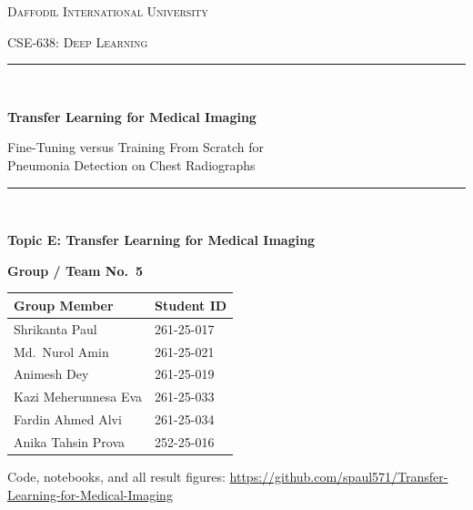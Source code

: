\documentclass[11pt,a4paper]{article}
\numberwithin{figure}{section}
\numberwithin{table}{section}
\begin{document}
\begin{titlepage}
\centering
\vspace*{1.5cm}

{\scshape\huge Daffodil International University\par}
\vspace{0.4cm}
{\scshape CSE-638: Deep Learning\par}
\vspace{2.0cm}

\rule{\linewidth}{0.4mm}\\[0.5cm]
{\huge\bfseries Transfer Learning for Medical Imaging\par}
\vspace{0.6cm}
{\Large Fine-Tuning versus Training From Scratch for\\[0.2cm]
Pneumonia Detection on Chest Radiographs\par}
\rule{\linewidth}{0.4mm}\\[1.5cm]

{\large\textbf{Topic E: Transfer Learning for Medical Imaging}\par}
\vspace{1.5cm}

{\large\textbf{Group / Team No.\ 5}\par}

{\large
\begin{tabular}{ll}
\toprule
\textbf{Group Member} & \textbf{Student ID} \\
\midrule
Shrikanta Paul & 261-25-017 \\
Md.\ Nurol Amin & 261-25-021 \\
Animesh Dey & 261-25-019 \\
Kazi Meherunnesa Eva & 261-25-033 \\
Fardin Ahmed Alvi & 261-25-034 \\
Anika Tahsin Prova & 252-25-016 \\
\bottomrule
\end{tabular}\par}

\vfill


\vspace{1.6cm}

{\small Code, notebooks, and all result figures:
\textcolor{blue}{\url{https://github.com/spaul571/Transfer-Learning-for-Medical-Imaging}}\par}

\end{titlepage}
\end{document}
